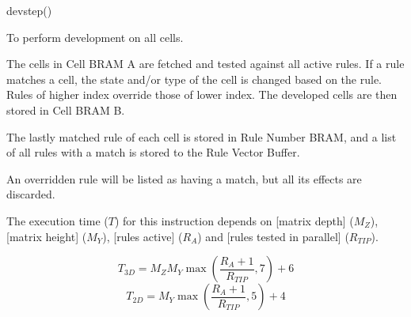 

\format

devstep()

\purpose

To perform development on all cells.

\description

The cells in Cell BRAM A are fetched and tested against all active rules.
If a rule matches a cell, the state and/or type of the cell is changed based on the rule.
Rules of higher index override those of lower index.
The developed cells are then stored in Cell BRAM B.

The lastly matched rule of each cell is stored in Rule Number BRAM, and a list of all rules with a match is stored to the Rule Vector Buffer.

\notes

An overridden rule will be listed as having a match, but all its effects are discarded.

The execution time ($T$) for this instruction depends on [matrix depth] ($M_Z$), [matrix height] ($M_Y$), [rules active] ($R_A$) and [rules tested in parallel] ($R_{TIP}$).

$$ T_{3D} = M_Z M_Y \max \left( \frac{ R_A + 1 }{ R_{TIP} }, 7 \right) + 6 $$
$$ T_{2D} = M_Y \max \left( \frac{ R_A + 1 }{ R_{TIP} }, 5 \right) + 4 $$
